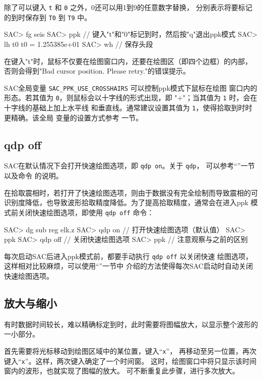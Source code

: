 除了可以键入 \texttt{t} 和 \texttt{0} 之外，0还可以用1到9的任意数字替换，
分别表示将要标记的到时保存到 \texttt{T0} 到 \texttt{T9} 中。

\begin{SACCode}
SAC> fg seis
SAC> ppk
// 键入"t"和"0"标记到时，然后按"q"退出ppk模式
SAC> lh t0
     t0 = 1.255385e+01
SAC> wh         // 保存头段
\end{SACCode}

\begin{note}
在键入"t"时，鼠标不仅要在绘图窗口内，还要在绘图区（即四个边框）的内部，
否则会得到"Bad cursor position. Please retry."的错误提示。
\end{note}

\begin{note}
SAC全局变量 \verb|SAC_PPK_USE_CROSSHAIRS| 可以控制ppk模式下鼠标在绘图
窗口内的形态。若其值为 \texttt{0}，则鼠标会以十字线的形式出现，即
"{\Large$+$}"；当其值为 \texttt{1} 时，会在十字线的基础上加上水平线
和垂直线。通常建议设置其值为 \texttt{1}，使得拾取到时时更精确。该全局
变量的设置方式参考  一节。
\end{note}

\subsection{qdp off}
SAC在默认情况下会打开快速绘图选项，即 \texttt{qdp on}。关于 \texttt{qdp}，
可以参考``''一节以及命令 
的说明。

在拾取震相时，若打开了快速绘图选项，则由于数据没有完全绘制而导致震相的可
识别度降低，也导致波形拾取精度降低。为了提高拾取精度，通常会在进入ppk
模式前关闭快速绘图选项，即使用 \texttt{qdp off} 命令：
\begin{SACCode}
SAC> dg sub reg elk.z
SAC> qdp on     // 打开快速绘图选项（默认值）
SAC> ppk
SAC> qdp off    // 关闭快速绘图选项
SAC> ppk        // 注意观察与之前的区别
\end{SACCode}
每次启动SAC后进入ppk模式前，都要手动执行 \texttt{qdp off} 以关闭快速
绘图选项，这样相对比较麻烦，可以使用``''一节中
介绍的方法使得每次SAC启动时自动关闭快速绘图选项。

\subsection{放大与缩小}
有时数据时间较长，难以精确标定到时，此时需要将图幅放大，以显示整个波形的
一小部分。

首先需要将光标移动到绘图区域中的某位置，键入``\texttt{x}''，
再移动至另一位置，再次键入``\texttt{x}''。这样，两次键入确定了一个时间窗。
这时，绘图窗口中将只显示该时间窗内的波形，也就实现了图幅的放大。
可不断重复此步骤，进行多次放大。

